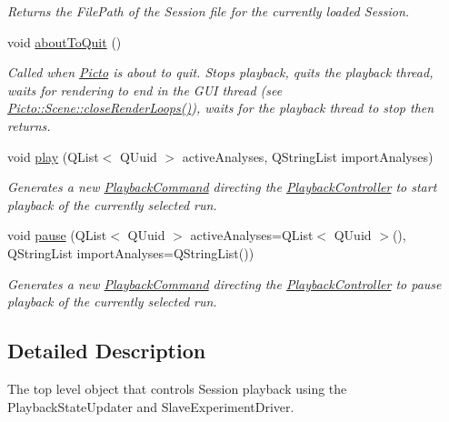 \begin{DoxyCompactItemize}
\begin{DoxyCompactList}\small\item\em Returns the File\-Path of the Session file for the currently loaded Session. \end{DoxyCompactList}\item 
\hypertarget{class_playback_controller_a2ca7251a2b00c59cf2c55bc634380dc5}{void \hyperlink{class_playback_controller_a2ca7251a2b00c59cf2c55bc634380dc5}{about\-To\-Quit} ()}\label{class_playback_controller_a2ca7251a2b00c59cf2c55bc634380dc5}

\begin{DoxyCompactList}\small\item\em Called when \hyperlink{namespace_picto}{Picto} is about to quit. Stops playback, quits the playback thread, waits for rendering to end in the G\-U\-I thread (see \hyperlink{class_picto_1_1_scene_ae8009d1b0b96e81c50706fcccbd18b0b}{Picto\-::\-Scene\-::close\-Render\-Loops()}), waits for the playback thread to stop then returns. \end{DoxyCompactList}\item 
void \hyperlink{class_playback_controller_afc291b7029c1eda156aad5187b3c43f6}{play} (Q\-List$<$ Q\-Uuid $>$ active\-Analyses, Q\-String\-List import\-Analyses)
\begin{DoxyCompactList}\small\item\em Generates a new \hyperlink{struct_playback_command}{Playback\-Command} directing the \hyperlink{class_playback_controller}{Playback\-Controller} to start playback of the currently selected run. \end{DoxyCompactList}\item 
void \hyperlink{class_playback_controller_ac0d6f4d474fc5fce75e4d822360dbd08}{pause} (Q\-List$<$ Q\-Uuid $>$ active\-Analyses=Q\-List$<$ Q\-Uuid $>$(), Q\-String\-List import\-Analyses=Q\-String\-List())
\begin{DoxyCompactList}\small\item\em Generates a new \hyperlink{struct_playback_command}{Playback\-Command} directing the \hyperlink{class_playback_controller}{Playback\-Controller} to pause playback of the currently selected run. \end{DoxyCompactList}\end{DoxyCompactItemize}


\subsection{Detailed Description}
The top level object that controls Session playback using the Playback\-State\-Updater and Slave\-Experiment\-Driver. 

